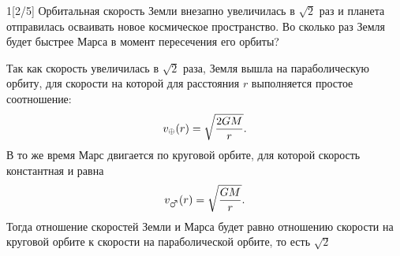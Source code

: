 \documentclass[12pt,a4paper]{article}
\begin{document}
\begin{task}{1}[2/5]
    Орбитальная скорость Земли внезапно увеличилась в $\sqrt{2}$ раз и планета отправилась осваивать новое космическое пространство. Во сколько раз Земля будет быстрее Марса в момент пересечения его орбиты?
\end{task}



\begin{solution}
    Так как скорость увеличилась в $\sqrt{2}$ раза, Земля вышла на параболическую орбиту, для скорости на которой для расстояния $r$ выполняется простое соотношение:
    $$
    v_{\oplus}(r) = \sqrt{\frac{2GM}{r}}.
    $$
    В то же время Марс двигается по круговой орбите, для которой скорость константная и равна
    $$
    v_{\mars}(r) = \sqrt{\frac{GM}{r}}.
    $$
    Тогда отношение скоростей Земли и Марса будет равно отношению скорости на круговой орбите к скорости на параболической орбите, то есть $\sqrt{2}$
\end{solution}
\end{document}
